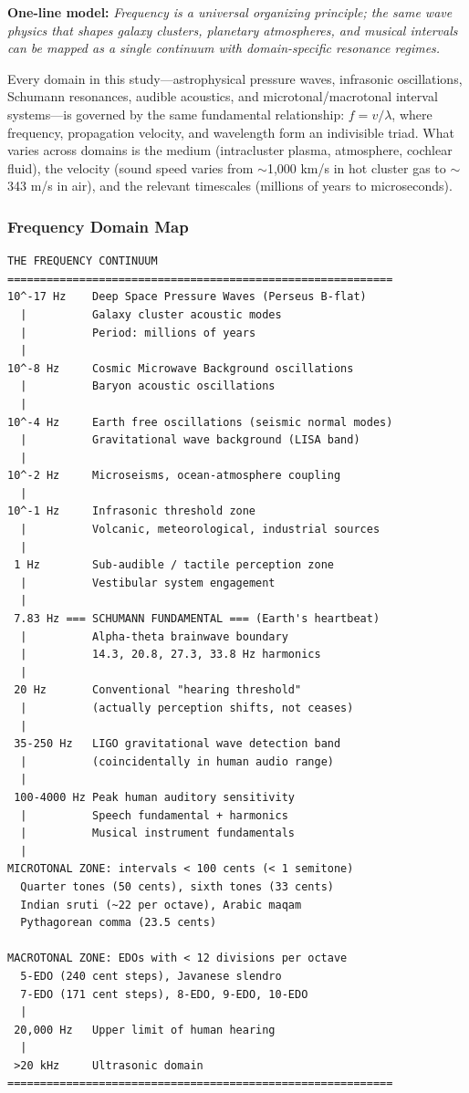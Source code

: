 \documentclass[11pt,letterpaper]{article}
\begin{document}
\textbf{One-line model:} \textit{Frequency is a universal organizing principle; the same wave physics that shapes galaxy clusters, planetary atmospheres, and musical intervals can be mapped as a single continuum with domain-specific resonance regimes.}

Every domain in this study---astrophysical pressure waves, infrasonic oscillations, Schumann resonances, audible acoustics, and microtonal/macrotonal interval systems---is governed by the same fundamental relationship: $f = v / \lambda$, where frequency, propagation velocity, and wavelength form an indivisible triad. What varies across domains is the medium (intracluster plasma, atmosphere, cochlear fluid), the velocity (sound speed varies from $\sim$1,000 km/s in hot cluster gas to $\sim$343 m/s in air), and the relevant timescales (millions of years to microseconds).

\subsubsection{Frequency Domain Map}

\begin{asciibox}
\begin{verbatim}
THE FREQUENCY CONTINUUM
===========================================================
10^-17 Hz    Deep Space Pressure Waves (Perseus B-flat)
  |          Galaxy cluster acoustic modes
  |          Period: millions of years
  |
10^-8 Hz     Cosmic Microwave Background oscillations
  |          Baryon acoustic oscillations
  |
10^-4 Hz     Earth free oscillations (seismic normal modes)
  |          Gravitational wave background (LISA band)
  |
10^-2 Hz     Microseisms, ocean-atmosphere coupling
  |
10^-1 Hz     Infrasonic threshold zone
  |          Volcanic, meteorological, industrial sources
  |
 1 Hz        Sub-audible / tactile perception zone
  |          Vestibular system engagement
  |
 7.83 Hz === SCHUMANN FUNDAMENTAL === (Earth's heartbeat)
  |          Alpha-theta brainwave boundary
  |          14.3, 20.8, 27.3, 33.8 Hz harmonics
  |
 20 Hz       Conventional "hearing threshold"
  |          (actually perception shifts, not ceases)
  |
 35-250 Hz   LIGO gravitational wave detection band
  |          (coincidentally in human audio range)
  |
 100-4000 Hz Peak human auditory sensitivity
  |          Speech fundamental + harmonics
  |          Musical instrument fundamentals
  |
MICROTONAL ZONE: intervals < 100 cents (< 1 semitone)
  Quarter tones (50 cents), sixth tones (33 cents)
  Indian sruti (~22 per octave), Arabic maqam
  Pythagorean comma (23.5 cents)

MACROTONAL ZONE: EDOs with < 12 divisions per octave
  5-EDO (240 cent steps), Javanese slendro
  7-EDO (171 cent steps), 8-EDO, 9-EDO, 10-EDO
  |
 20,000 Hz   Upper limit of human hearing
  |
 >20 kHz     Ultrasonic domain
===========================================================
\end{verbatim}
\end{asciibox}
\end{document}
